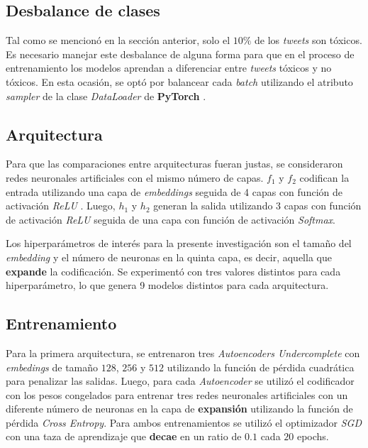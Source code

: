 \subsection{Desbalance de clases}

Tal como se mencionó en la sección anterior, solo el $10\%$ de los \textit{tweets} son tóxicos. Es necesario manejar este desbalance de alguna forma para que en el proceso de entrenamiento los modelos aprendan a diferenciar entre \textit{tweets} tóxicos y no tóxicos. En esta ocasión, se optó por balancear cada \textit{batch} utilizando el atributo \textit{sampler} de la clase \textit{DataLoader} de \textbf{PyTorch} \cite{DBLP:journals/corr/abs-1912-01703}. 


\subsection{Arquitectura}

Para que las comparaciones entre arquitecturas fueran justas, se consideraron redes neuronales artificiales con el mismo número de capas. $f_1$ y $f_2$ codifican la entrada utilizando una capa de \textit{embeddings} seguida de 4 capas con función de activación \textit{ReLU} \cite{DBLP:journals/corr/abs-1803-08375}. Luego, $h_1$ y $h_2$ generan la salida utilizando 3 capas con función de activación \textit{ReLU} seguida de una capa con función de activación \textit{Softmax}. 

Los hiperparámetros de interés para la presente investigación son el tamaño del \textit{embedding} y el número de neuronas en la quinta capa, es decir, aquella que \textbf{expande} la codificación. Se experimentó con tres valores distintos para cada hiperparámetro, lo que genera 9 modelos distintos para cada arquitectura.


\subsection{Entrenamiento}

Para la primera arquitectura, se entrenaron tres \textit{Autoencoders Undercomplete} con \textit{embedings} de tamaño $128$, $256$ y $512$ utilizando la función de pérdida cuadrática para penalizar las salidas. Luego, para cada \textit{Autoencoder} se utilizó el codificador con los pesos congelados para entrenar tres redes neuronales artificiales con un diferente número de neuronas en la capa de \textbf{expansión} utilizando la función de pérdida \textit{Cross Entropy}. Para ambos entrenamientos se utilizó el optimizador \textit{SGD} con una taza de aprendizaje que \textbf{decae} en un ratio de $0.1$ cada $20$ epochs. 

